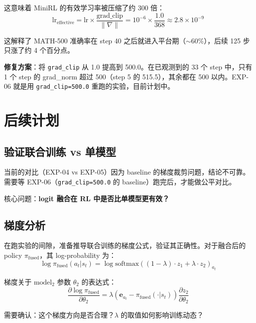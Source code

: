 \documentclass[11pt,a4paper]{article}
\begin{document}
这意味着 MiniRL 的有效学习率被压缩了约 300 倍：
\begin{equation}
\text{lr}_{\text{effective}} = \text{lr} \times \frac{\text{grad\_clip}}{\|\nabla\|} = 10^{-6} \times \frac{1.0}{368} \approx 2.8 \times 10^{-9}
\end{equation}

这解释了 MATH-500 准确率在 step 40 之后就进入平台期（$\sim$60\%），后续 125 步只涨了约 4 个百分点。

\textbf{修复方案}：将 \texttt{grad\_clip} 从 1.0 提高到 500.0。在已观测到的 33 个 step 中，只有 1 个 step 的 grad\_norm 超过 500（step 5 的 515.5），其余都在 500 以内。EXP-06 就是用 \texttt{grad\_clip=500.0} 重跑的实验，目前计划中。

\section{后续计划}

\subsection{验证联合训练 vs 单模型}

当前的对比（EXP-04 vs EXP-05）因为 baseline 的梯度裁剪问题，结论不可靠。需要等 EXP-06（\texttt{grad\_clip=500.0} 的 baseline）跑完后，才能做公平对比。

核心问题：\textbf{logit 融合在 RL 中是否比单模型更有效？}

\subsection{梯度分析}

在跑实验的间隙，准备推导联合训练的梯度公式，验证其正确性。对于融合后的 policy $\pi_{\text{fused}}$，其 log-probability 为：
\begin{equation}
\log \pi_{\text{fused}}(a_t | s_t) = \log \text{softmax}\left((1-\lambda) \cdot z_1 + \lambda \cdot z_2\right)_{a_t}
\end{equation}

梯度关于 $\text{model}_2$ 参数 $\theta_2$ 的表达式：
\begin{equation}
\frac{\partial \log \pi_{\text{fused}}}{\partial \theta_2} = \lambda \left(\mathbf{e}_{a_t} - \pi_{\text{fused}}(\cdot|s_t)\right) \frac{\partial z_2}{\partial \theta_2}
\end{equation}

需要确认：这个梯度方向是否合理？$\lambda$ 的取值如何影响训练动态？
\end{document}
